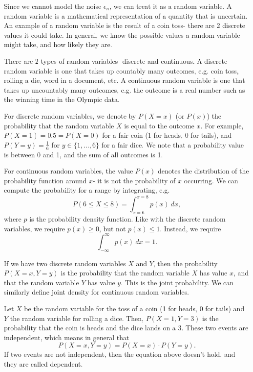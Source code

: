 \documentclass[a4paper, openany]{memoir}
\begin{document}
    Since we cannot model the noise $\epsilon_n$, we can treat it as a random variable. A random variable is a mathematical representation of a quantity that is uncertain. An example of a random variable is the result of a coin toss- there are 2 discrete values it could take. In general, we know the possible values a random variable might take, and how likely they are.

    There are 2 types of random variables- discrete and continuous. A discrete random variable is one that takes up countably many outcomes, e.g. coin toss, rolling a die, word in a document, etc. A continuous random variable is one that takes up uncountably many outcomes, e.g. the outcome is a real number such as the winning time in the Olympic data. 
    
    For discrete random variables, we denote by $P(X = x)$ (or $P(x)$) the probability that the random variable $X$ is equal to the outcome $x$. For example, $P(X = 1) = 0.5 = P(X = 0)$ for a fair coin (1 for heads, 0 for tails), and $P(Y = y) = \frac{1}{6}$ for $y \in \{1, \dots, 6\}$ for a fair dice. We note that a probability value is between 0 and 1, and the sum of all outcomes is 1. 
    
    For continuous random variables, the value $P(x)$ denotes the distribution of the probability function around $x$- it is not the probability of $x$ occurring. We can compute the probability for a range by integrating, e.g.
    \[P(6 \leq X \leq 8) = \int_{x=6}^{x=8} p(x) \ dx,\]
    where $p$ is the probability density function. Like with the discrete random variables, we require $p(x) \geq 0$, but not $p(x) \leq 1$. Instead, we require
    \[\int_{-\infty}^\infty p(x) \ dx = 1.\]

    If we have two discrete random variables $X$ and $Y$, then the probability $P(X = x, Y = y)$ is the probability that the random variable $X$ has value $x$, and that the random variable $Y$ has value $y$. This is the joint probability. We can similarly define joint density for continuous random variables.

    Let $X$ be the random variable for the toss of a coin (1 for heads, 0 for tails) and $Y$ the random variable for rolling a dice. Then, $P(X = 1, Y = 3)$ is the probability that the coin is heads and the dice lands on a 3. These two events are independent, which means in general that
    \[P(X = x, Y = y) = P(X = x) \cdot P(Y = y).\]
    If two events are not independent, then the equation above doesn't hold, and they are called dependent.
\end{document}

